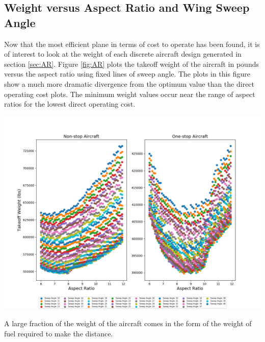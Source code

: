 \documentclass{article}
\begin{document}
    \subsection{Weight versus Aspect Ratio and Wing Sweep Angle}
    \label{sec:weight}
        \begin{flushleft}
            Now that the most efficient plane in terms of cost to operate has
            been found, it is of interest to look at the weight of each discrete
            aircraft design generated in section \ref{sec:AR}. Figure
            \ref{fig:AR} plots the takeoff weight of the aircraft in pounds
            versus the aspect ratio using fixed lines of sweep angle. The plots
            in this figure show a much more dramatic divergence from the optimum
            value than the direct operating cost plots. The minimum weight
            values occur near the range of aspect ratios for the lowest direct
            operating cost.
        \end{flushleft}

        \begin{center}
            \includegraphics[scale=0.5]{Weight v Sweep Angle.PNG}
            \label{fig:AR}
        \end{center}

        \begin{flushleft}
            A large fraction of the weight of the aircraft comes in the form of the weight of fuel required to make the distance.
        \end{flushleft}
\end{document}
